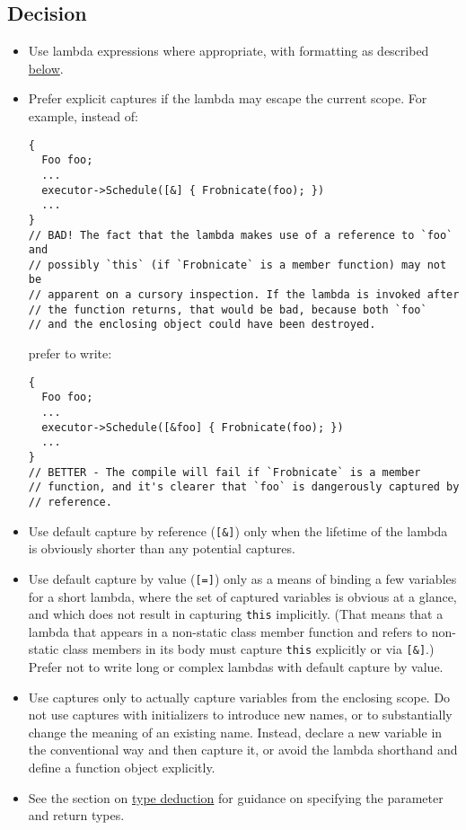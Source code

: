 \subsection{Decision}
\begin{itemize}
\item Use lambda expressions where appropriate, with formatting as described \hyperref[sec:lambda-expressions]{below}.
\item Prefer explicit captures if the lambda may escape the current scope. For example, instead of:
\begin{verbatim}
{
  Foo foo;
  ...
  executor->Schedule([&] { Frobnicate(foo); })
  ...
}
// BAD! The fact that the lambda makes use of a reference to `foo` and
// possibly `this` (if `Frobnicate` is a member function) may not be
// apparent on a cursory inspection. If the lambda is invoked after
// the function returns, that would be bad, because both `foo`
// and the enclosing object could have been destroyed.
\end{verbatim}
prefer to write:
\begin{verbatim}
{
  Foo foo;
  ...
  executor->Schedule([&foo] { Frobnicate(foo); })
  ...
}
// BETTER - The compile will fail if `Frobnicate` is a member
// function, and it's clearer that `foo` is dangerously captured by
// reference.
\end{verbatim}
\item Use default capture by reference (\texttt{[&]}) only when the lifetime of the lambda is obviously shorter than any potential captures.
\item Use default capture by value (\texttt{[=]}) only as a means of binding a few variables for a short lambda, where the set of captured variables is obvious at a glance, and which does not result in capturing \texttt{this} implicitly. (That means that a lambda that appears in a non-static class member function and refers to non-static class members in its body must capture \texttt{this} explicitly or via \texttt{[&]}.) Prefer not to write long or complex lambdas with default capture by value.
\item Use captures only to actually capture variables from the enclosing scope. Do not use captures with initializers to introduce new names, or to substantially change the meaning of an existing name. Instead, declare a new variable in the conventional way and then capture it, or avoid the lambda shorthand and define a function object explicitly.
\item See the section on \hyperref[sec:type-deduction-(including-auto)]{type deduction} for guidance on specifying the parameter and return types.
\end{itemize}
